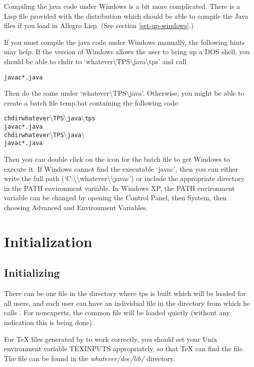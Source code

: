 Compiling the java code under Windows is a bit
more complicated.  There is a Lisp file
 provided
with the distribution which should be able
to compile the Java files if you load
 in
Allegro Lisp.  (See section \ref{set-up-windows}.)

If you must compile the java code under Windows
manually, the following hints may help.
If the version of Windows allows
the user to bring up a DOS shell, you should be
able to chdir to `whatever\(\setminus\)TPS\(\setminus\)java\(\setminus\)tps' and call
\begin{alltt}
javac *.java
\end{alltt}
Then do the same under `whatever\(\setminus\)TPS\(\setminus\)java'.
Otherwise, you might be able to create a batch file
temp.bat containing the following code:
\begin{alltt}
chdir whatever\(\setminus\)TPS\(\setminus\)java\(\setminus\)tps
javac *.java
chdir whatever\(\setminus\)TPS\(\setminus\)java\(\setminus\)
javac *.java
\end{alltt}
Then you can double click on the icon for the batch file
to get Windows to execute it.
If Windows cannot find the executable `javac',
then you can either write the full path (`C:\(\setminus\setminus\)whatever\(\setminus\setminus\)javac')
or include the appropriate directory in the PATH environment variable.
In Windows XP, the PATH environment
variable can be changed by opening the Control Panel, then System,
then choosing Advanced and Environment Variables.

\section{Initialization}\label{Initialization}

\subsection{Initializing {\TPS}}

There can be one  file in the
directory where tps is built which will be loaded for all
users, and each  user can have an individual  file in
the directory from which he calls {\TPS}.
For nonexperts, the common  file will be loaded quietly
(without any indication this is being done).

For TeX files generated by {\TPS} to work correctly,
you should set your Unix environment variable TEXINPUTS appropriately, so that TeX
can find the  file.  The  file
can be found in the {\it whatever/doc/lib/} directory.

